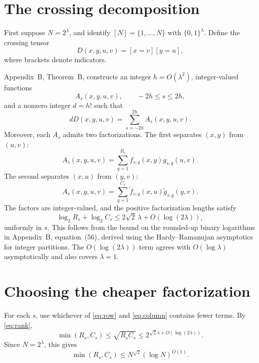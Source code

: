 \documentclass[11pt,a4paper]{article}
\begin{document}
\section{The crossing decomposition}

First suppose \(N=2^\lambda\), and identify \([N]=\{1,\ldots,N\}\) with
\(\{0,1\}^{\lambda}\). Define the crossing tensor
\[
  D(x,y,u,v)=[x=v][y=u],
\]
where brackets denote indicators.

Appendix~B, Theorem~B, constructs an integer \(h=O(\lambda^2)\),
integer-valued functions
\[
  A_s(x,y,u,v),\qquad -2h\leq s\leq 2h,
\]
and a nonzero integer \(d=h!\) such that
\begin{equation}
  dD(x,y,u,v)=\sum_{s=-2h}^{2h}A_s(x,y,u,v).
  \label{eq:decomposition}
\end{equation}
Moreover, each \(A_s\) admits two factorizations. The first separates
\((x,y)\) from \((u,v)\):
\begin{equation}
  A_s(x,y,u,v)
  =\sum_{q=1}^{R_s}f_{s,q}(x,y)g_{s,q}(u,v).
  \label{eq:row}
\end{equation}
The second separates \((x,u)\) from \((y,v)\):
\begin{equation}
  A_s(x,y,u,v)
  =\sum_{q=1}^{C_s}
    \widetilde f_{s,q}(x,u)\widetilde g_{s,q}(y,v).
  \label{eq:column}
\end{equation}
The factors are integer-valued, and the positive factorization lengths
satisfy
\begin{equation}
  \log_2 R_s+\log_2 C_s
  \leq 2\sqrt{2}\,\lambda+O\!\left(\log(2\lambda)\right),
  \label{eq:rank}
\end{equation}
uniformly in \(s\). This follows from the bound on the rounded-up binary
logarithms in Appendix~B, equation~(56), derived using the Hardy--Ramanujan
asymptotics for integer partitions. The \(O(\log(2\lambda))\) term agrees
with \(O(\log\lambda)\) asymptotically and also covers \(\lambda=1\).

\section{Choosing the cheaper factorization}

For each \(s\), use whichever of \eqref{eq:row} and \eqref{eq:column}
contains fewer terms. By \eqref{eq:rank},
\[
  \min(R_s,C_s)
  \leq \sqrt{R_sC_s}
  \leq 2^{\sqrt{2}\lambda+O(\log(2\lambda))}.
\]
Since \(N=2^\lambda\), this gives
\begin{equation}
  \min(R_s,C_s)
  \leq N^{\sqrt{2}}(\log N)^{O(1)}.
  \label{eq:minimum}
\end{equation}
\end{document}

